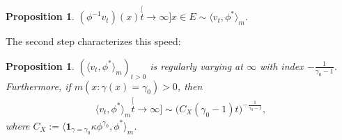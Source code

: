 \documentclass[UTF8]{pkuthss}
\theoremstyle{plain}
\newtheorem{prop}[thm]{Proposition}
\theoremstyle{definition}
\numberwithin{equation}{section}
\begin{document}
\begin{prop}
\label{prop: convergence in a same speed}
	$(\phi^{-1}v_t)(x) \stackrel[t\to\infty]{x\in E}{\sim} \langle v_t,\phi^*\rangle_m$.
\end{prop}
\label{prop: asymptotic equivalence of vtphi}
	The second step characterizes this speed:
\begin{prop}
\label{prop: regularly varying of vt-phi-star}
	$(\langle v_t,\phi^*\rangle_m)_{t> 0} $ is regularly varying at $\infty$ with index $-\frac{1}{\gamma_0-1}$.
	Furthermore, if $m(x: \gamma (x)= \gamma_0)>0$, then
\begin{align}
	\langle v_t,\phi^*\rangle_m
	\stackrel[t\to \infty]{}{\sim} \big(C_X(\gamma_0-1) t \big)^{-\frac{1}{\gamma_0 - 1}},
\end{align}
	where $C_X:= \langle \mathbf 1_{\gamma= \gamma_0} \kappa \phi^{\gamma_0}, \phi^* \rangle_m $.
\end{prop}
\end{document}
